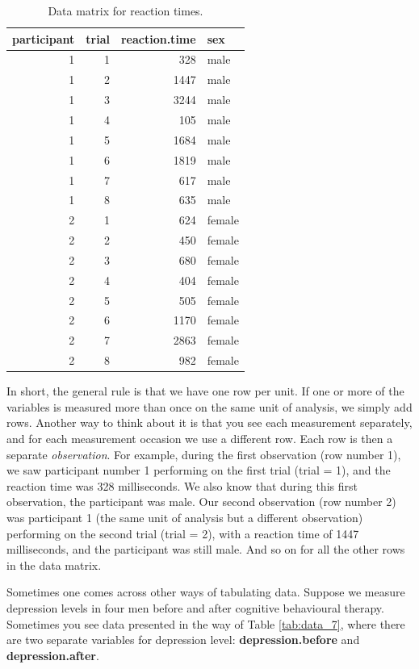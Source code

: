 \documentclass[]{report}\usepackage[]{graphicx}\usepackage[]{color}
\begin{document}
\begin{table}[ht]
\centering
\caption{Data matrix for reaction times.} 
\label{tab:data_6}
\begin{tabular}{rrrl}
  \hline
participant & trial & reaction.time & sex \\ 
  \hline
1 & 1 & 328 & male \\ 
  1 & 2 & 1447 & male \\ 
  1 & 3 & 3244 & male \\ 
  1 & 4 & 105 & male \\ 
  1 & 5 & 1684 & male \\ 
  1 & 6 & 1819 & male \\ 
  1 & 7 & 617 & male \\ 
  1 & 8 & 635 & male \\ 
  2 & 1 & 624 & female \\ 
  2 & 2 & 450 & female \\ 
  2 & 3 & 680 & female \\ 
  2 & 4 & 404 & female \\ 
  2 & 5 & 505 & female \\ 
  2 & 6 & 1170 & female \\ 
  2 & 7 & 2863 & female \\ 
  2 & 8 & 982 & female \\ 
   \hline
\end{tabular}
\end{table}



In short, the general rule is that we have one row per unit. If one or more of the variables is measured more than once on the same unit of analysis, we simply add rows. Another way to think about it is that you see each measurement separately, and for each measurement occasion we use a different row. Each row is then a separate \textit{observation}. For example, during the first observation (row number 1), we saw participant number 1 performing on the first trial (trial = 1), and the reaction time was 328 milliseconds. We also know that during this first observation, the participant was male. Our second observation (row number 2) was participant 1 (the same unit of analysis but a different observation) performing on the second trial (trial = 2), with a reaction time of 1447 milliseconds, and the participant was still male. And so on for all the other rows in the data matrix.

Sometimes one comes across other ways of tabulating data. Suppose we measure depression levels in four men before and after cognitive behavioural therapy. Sometimes you see data presented in the way of Table \ref{tab:data_7}, where there are two separate variables for depression level: \textbf{depression.before} and \textbf{depression.after}.
\end{document}
